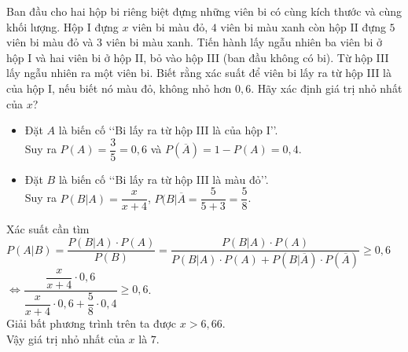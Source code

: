 \begin{ex} %
	Ban đầu cho hai hộp bi riêng biệt đựng những viên bi có cùng kích thước và cùng khối lượng. Hộp I đựng $x$ viên bi màu đỏ, $4$ viên bi màu xanh còn hộp II đựng $5$ viên bi màu đỏ và $3$ viên bi màu xanh. Tiến hành lấy ngẫu nhiên ba viên bi ở hộp I và hai viên bi ở hộp II, bỏ vào hộp III (ban đầu không có bi). Từ hộp III lấy ngẫu nhiên ra một viên bi. Biết rằng xác suất để viên bi lấy ra từ hộp III là của hộp I, nếu biết nó màu đỏ, không nhỏ hơn $0{,}6$. Hãy xác định giá trị nhỏ nhất của $x$?
	\begin{center}
	\end{center}
	
	\loigiai
	{
	\begin{itemize}
		\item Đặt $A$ là biến cố \lq\lq Bi lấy ra từ hộp III là của hộp I\rq\rq. \\Suy ra $P(A) = \dfrac{3}{5} = 0{,}6$ và $P(\overline{A})=1-P(A)=0{,}4$.
		\item Đặt $B$ là biến cố  \lq\lq Bi lấy ra từ hộp III là màu đỏ\rq\rq.\\
		Suy ra $P(B|A)=\dfrac{x}{x+4}$, $P(B|\overline{A}=\dfrac{5}{5+3}=\dfrac{5}{8}$.
	\end{itemize}
	
	Xác suất cần tìm $ P(A|B) = \dfrac{P(B|A) \cdot P(A)}{P(B)}=\dfrac{P(B|A) \cdot P(A)}{P(B|A) \cdot P(A) + P(B|\overline{A}) \cdot P(\overline{A})}\geq 0{,}6$ \\ $\Leftrightarrow \dfrac{\dfrac{x}{x+4} \cdot 0{,}6}{\dfrac{x}{x+4} \cdot 0{,}6 + \dfrac{5}{8} \cdot 0{,}4} \geq 0{,}6$.\\
	Giải bất phương trình trên ta được $ x > 6{,}66$.\\
	Vậy giá trị nhỏ nhất của $x$ là $7$.
}
\end{ex}

